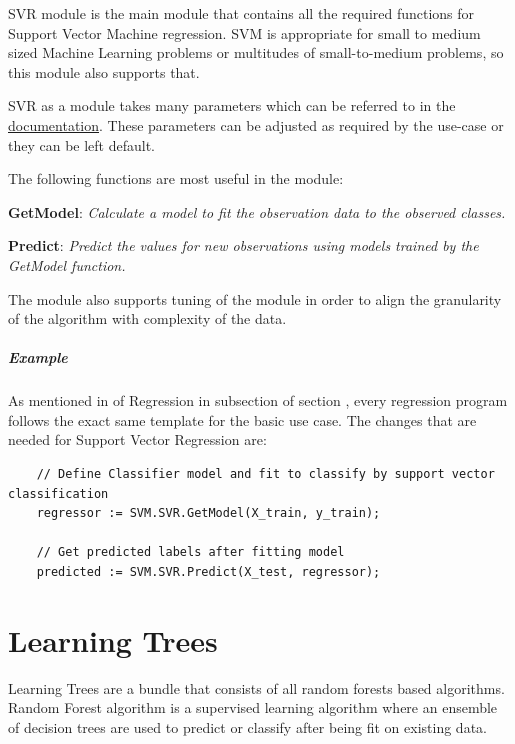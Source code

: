 \documentclass[a4paper,oneside,12pt]{book}
\begin{document}
SVR module is the main module that contains all the required functions for Support Vector Machine regression. SVM is appropriate for small to medium sized Machine Learning problems or multitudes of small-to-medium problems, so this module also supports that. 

SVR as a module takes many parameters which can be referred to in the \href{https://cdn.hpccsystems.com/pdf/ml/SupportVectorMachines.pdf}{documentation}. These parameters can be adjusted as required by the use-case or they can be left default. 

The following functions are most useful in the module:

\textbf{GetModel}: \textit{Calculate a model to fit the observation data to the observed classes.}

\textbf{Predict}: \textit{Predict the values for new observations using models trained by the GetModel function.}

The module also supports tuning of the module in order to align the granularity of the algorithm with complexity of the data.

\paragraph{Example}

As mentioned in  of Regression in  subsection of section , every regression program follows the exact same template for the basic use case. The changes that are needed for Support Vector Regression are:

\begin{lstlisting}
    // Define Classifier model and fit to classify by support vector classification
    regressor := SVM.SVR.GetModel(X_train, y_train);

    // Get predicted labels after fitting model
    predicted := SVM.SVR.Predict(X_test, regressor);
\end{lstlisting}

\chapter{Learning Trees}\label{supe:learntrees}

Learning Trees are a bundle that consists of all random forests based algorithms. Random Forest algorithm is a supervised learning algorithm where an ensemble of decision trees are used to predict or classify after being fit on existing data.
\end{document}
